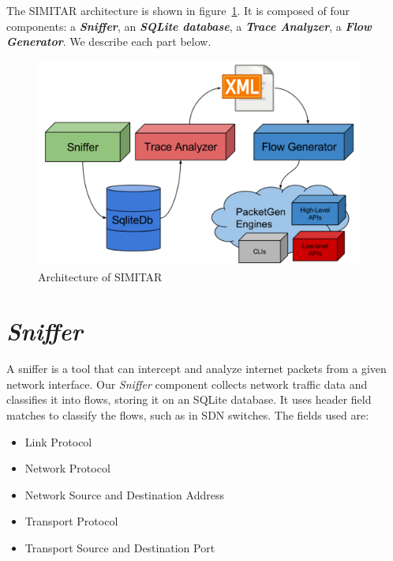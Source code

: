The SIMITAR architecture is shown in figure~\ref{fig:architecture}. It is composed of four components: a \textbf{\textit{Sniffer}}, an \textbf{\textit{SQLite database}}, a \textbf{\textit{Trace Analyzer}}, a \textbf{\textit{Flow Generator}}. We describe each part below.

\begin{figure}[ht!]
        \centering
        \includegraphics[height=2.7in]{figures/ch3/architecture-diagram}
        \caption{Architecture of SIMITAR}
    \label{fig:architecture}
\end{figure}

\section{ \textit{Sniffer} }


A sniffer is a tool that can intercept and analyze internet packets from a given network interface. Our \textit{Sniffer} component collects network traffic data and classifies it into flows, storing it on an SQLite database. It uses header field matches to classify the flows, such as in SDN switches\cite{sdn-survey}. The fields used  are:

\begin{itemize}
\item Link Protocol
\item Network Protocol
\item Network Source and Destination Address
\item Transport Protocol
\item Transport Source and Destination Port
\end{itemize}



